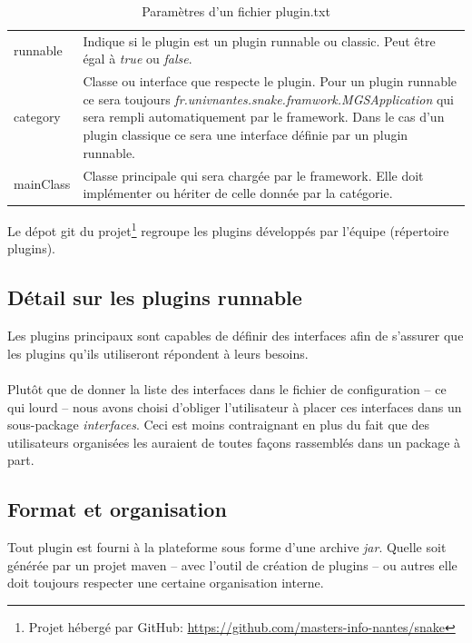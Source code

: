 \documentclass[12pt,a4paper]{article}
\begin{document}
\begin{table}[!h]\label{tab:plugintxt}
\centering
	\begin{tabular}{lp{10cm}}
		runnable & Indique si le plugin est un plugin runnable ou classic. 
		Peut être égal à \emph{true} ou \emph{false}.\\				
		
		category & Classe ou interface que respecte le plugin. Pour un plugin 
		runnable ce sera toujours \emph{fr.univnantes.snake.framwork.MGSApplication} 
		qui sera rempli automatiquement par le framework. Dans le cas d'un plugin 
		classique ce sera une interface définie par un plugin runnable.\\
		
		mainClass & Classe principale qui sera chargée par le framework. 
		Elle doit implémenter ou hériter de celle donnée par la catégorie.\\
	\end{tabular}	
\caption{Paramètres d'un fichier plugin.txt}
\end{table}

Le dépot git du projet\footnote{Projet hébergé par GitHub: 
\href{github.com/masters-info-nantes/snake}
{https://github.com/masters-info-nantes/snake}} regroupe les plugins développés 
par l'équipe (répertoire plugins).

\subsection{Détail sur les plugins runnable}\label{sss:DetailsRunnable}
Les plugins principaux sont capables de définir des interfaces afin de s'assurer 
que les plugins qu'ils utiliseront répondent à leurs besoins.
\\\\
Plutôt que de donner la liste des interfaces dans le fichier de configuration -- 
ce qui lourd -- nous avons choisi d'obliger l'utilisateur à placer ces interfaces 
dans un sous-package \emph{interfaces}. Ceci est moins contraignant en plus du 
fait que des utilisateurs organisées les auraient de toutes façons rassemblés 
dans un package à part.

\subsection{Format et organisation}
Tout plugin est fourni à la plateforme sous forme d'une archive \emph{jar}. Quelle 
soit générée par un projet maven -- avec l'outil de création de plugins -- ou autres 
elle doit toujours respecter une certaine organisation interne.
\end{document}
